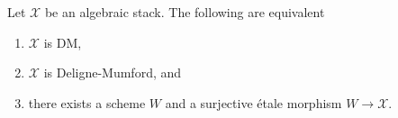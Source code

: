 %
\begin{theorem}
\label{theorem-DM}
Let $\mathcal{X}$ be an algebraic stack. The following are equivalent
\begin{enumerate}
\item $\mathcal{X}$ is DM,
\item $\mathcal{X}$ is Deligne-Mumford, and
\item there exists a scheme $W$ and a surjective \'etale
morphism $W \to \mathcal{X}$.
\end{enumerate}
\end{theorem}

